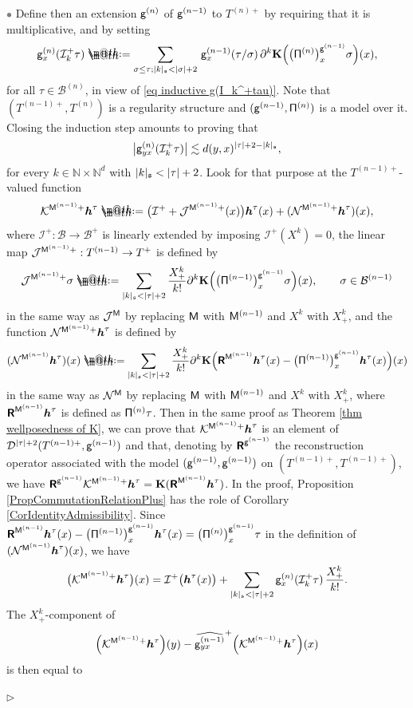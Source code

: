 \documentclass[10pt, reqno]{amsart}
\makeatletter
\numberwithin{subsection}{section}
\numberwithin{subsubsection}{subsection}
\numberwithin{equation}{section} %
\newenvironment{Dem}[1][\unskip]{%
    \begin{list}{\hspace{1.15cm}{\sf \textbf{{\small Proof #1 --}}}}{%
        \setlength{\topsep}{0pt}%
        \setlength{\leftmargin}{0pt}%
        \setlength{\rightmargin}{0pt}%
        \setlength{\listparindent}{0pt}%
        \setlength{\itemindent}{0pt}%
        \setlength{\parsep}{0pt}%
        \addtolength{\leftmargin}{0pt}%
        \addtolength{\rightmargin}{0pt}%
    } \item }{\hfill $\rhd$\end{list}\smallskip}
\theoremstyle{mystyle}
\theoremstyle{mystyle2}
\theoremstyle{mystyle3}
\newcommand{\bsh}{\boldsymbol{h}}
\newcommand{\ssk}{\smallskip}
\newcommand\bbN{\mathbb{N}}
\newcommand{\mcB}{\mathcal{B}}
\newcommand{\mcD}{\mathcal{D}}
\newcommand{\mcI}{\mathcal{I}}
\newcommand{\mcJ}{\mathcal{J}}
\newcommand{\mcK}{\mathcal{K}}
\newcommand{\mcN}{\mathcal{N}}
\newcommand{\bfK}{\mathbf{K}}
\newcommand{\Xplus}{X_+}
\newcommand*{\defeq}{\mathrel{\rlap{%
                     \raisebox{0.3ex}{$\m@th\cdot$}}%
                     \raisebox{-0.3ex}{$\m@th\cdot$}}%
                     =}
\makeatother
\begin{document}
\begin{Dem}

\textcolor{gray}{$\bullet$} Define then an extension ${\sf g}^{(n)}$ of ${\sf g}^{(n-1)}$ to $T^{(n)+}$ by requiring that it is multiplicative, and by setting 
$$
{\sf g}^{(n)}_x(\mcI^+_k\tau) \defeq  \sum_{\sigma\le\tau; |k|_{\frak{s}} < |\sigma|+2}\, {\sf g}^{(n-1)}_x(\tau/\sigma)\, \partial^k\bfK\Big(\big({\sf\Pi}^{(n)}\big)^{{\sf g}^{(n-1)}}_x\sigma\Big)(x),
$$ 
for all $\tau\in\mcB^{(n)}$, in view of \eqref{eq inductive g(I_k^+tau)}. 
Note that $(T^{(n-1)+},T^{(n)})$ is a regularity structure and $({\sf g}^{(n-1)},{\sf\Pi}^{(n)})$ is a model over it.
Closing the induction step amounts to proving that 
\begin{equation} \label{EqBoundConstructionAdmissible} 
\big|{\sf g}^{(n)}_{yx}(\mcI^+_k\tau)\big| \lesssim d(y,x)^{|\tau| + 2 - |k|_\frak{s}},
\end{equation} 
for every $k\in\bbN\times\bbN^d$ with $\vert k\vert_\frak{s}<\vert\tau\vert+2$. Look for that purpose at the $T^{(n-1)+}$-valued function 
$$
\mcK^{{\sf M}^{(n-1)}+} \bsh^\tau\defeq\big(\mcI^++\mcJ^{{\sf M}^{(n-1)}+}(x)\big)\bsh^\tau(x)+(\mcN^{{\sf M}^{(n-1)}+}\bsh^\tau)(x),
$$
where $\mcI^+:\mcB\to\mcB^+$ is linearly extended by imposing $\mcI^+(X^k)=0$, the linear map $\mcJ^{{\sf M}^{(n-1)}+}:T^{(n-1)}\to T^+$ is defined by
$$
\mcJ^{{\sf M}^{(n-1)}+}\sigma\defeq\sum_{|k|_{\frak{s}}<|\tau|+2}\frac{X_+^k}{k!}\partial^k\bfK\Big(\big({\sf\Pi}^{(n-1)}\big)^{{\sf g}^{(n-1)}}_x\sigma\Big)(x),\qquad\sigma\in\mcB^{(n-1)}
$$
in the same way as $\mcJ^{\sf M}$ by replacing ${\sf M}$ with ${\sf M}^{(n-1)}$ and $X^k$ with $X_+^k$, and the function $\mcN^{{\sf M}^{(n-1)}+}\bsh^\tau$ is defined by
$$
(\mcN^{{\sf M}^{(n-1)}}\bsh^\tau)(x)\defeq\sum_{|k|_{\frak{s}}<|\tau|+2}\frac{X_+^k}{k!}\partial^k{\bf K}
\Big(\textbf{\textsf{R}}^{{\sf M}^{(n-1)}}\bsh^\tau(x)-\big({\sf\Pi}^{(n-1)}\big)^{{\sf g}^{(n-1)}}_x\bsh^\tau(x)\Big)(x)
$$
in the same way as $\mcN^{\sf M}$ by replacing ${\sf M}$ with ${\sf M}^{(n-1)}$ and $X^k$ with $X_+^k$, where $\textbf{\textsf{R}}^{{\sf M}^{(n-1)}}\bsh^\tau$ is defined as ${\sf\Pi}^{(n)}\tau$.
Then in the same proof as Theorem \ref{thm wellposedness of K}, we can prove that $\mcK^{{\sf M}^{(n-1)}+} \bsh^\tau$ is an element of $\mcD^{|\tau|+2}(T^{(n-1)+},{\sf g}^{(n-1)})$ and that, denoting by $\textbf{\textsf{R}}^{{\sf g}^{(n-1)}}$ the reconstruction operator associated with the model $({\sf g}^{(n-1)},{\sf g}^{(n-1)})$ on $(T^{(n-1)+},T^{(n-1)+})$, we have $\textbf{\textsf{R}}^{{\sf g}^{(n-1)}}\mcK^{{\sf M}^{(n-1)}+} \bsh^\tau={\bf K}(\textbf{\textsf{R}}^{{\sf M}^{(n-1)}}\bsh^\tau)$. 
In the proof, Proposition \ref{PropCommutationRelationPlus} has the role of Corollary \ref{CorIdentityAdmissibility}.
Since $\textbf{\textsf{R}}^{{\sf M}^{(n-1)}}\bsh^\tau(x)-\big({\sf\Pi}^{(n-1)}\big)^{{\sf g}^{(n-1)}}_x\bsh^\tau(x)=\big({\sf\Pi}^{(n)}\big)^{{\sf g}^{(n-1)}}_x\tau$ in the definition of $(\mcN^{{\sf M}^{(n-1)}}\bsh^\tau)(x)$, we have
$$
\big(\mcK^{{\sf M}^{(n-1)}+} \bsh^\tau\big)(x) = \mcI^+\big(\bsh^\tau(x)\big) + \sum_{ |k|_{\frak{s}}<|\tau|+2} {\sf g}^{(n)}_x(\mcI^+_k\tau)\,\frac{\Xplus^k}{k!}.
$$
The $\Xplus^k$-component of 
$$
\Big(\mcK^{{\sf M}^{(n-1)}+} \bsh^\tau\Big)(y) - \widehat{{\sf g}^{(n-1)}_{yx}}^+\Big(\mcK^{{\sf M}^{(n-1)}+} \bsh^\tau\Big)(x)
$$ 
is then equal to 


\end{Dem}
\end{document}

